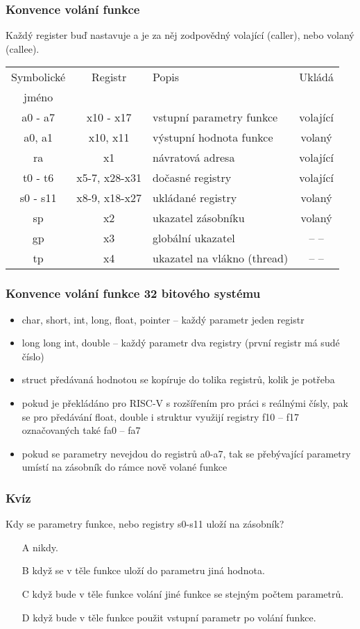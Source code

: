 \documentclass{beamer}
\begin{document}
\begin{frame}
\frametitle{Konvence volání funkce}

Každý register buď nastavuje a je za něj zodpovědný volající (caller), nebo volaný (callee). 

\begin{tabular}{|c|c|p{4cm}|c|}\hline
Symbolické & Registr & Popis & Ukládá \\
   jméno   &         &       &        \\ \hline
a0 - a7 & x10 - x17 & vstupní parametry funkce & volající \\\hline
a0, a1 & x10, x11 & výstupní hodnota funkce & volaný \\\hline
ra & x1 & návratová adresa & volající \\\hline
t0 - t6 & x5-7, x28-x31 & dočasné registry & volající\\\hline
s0 - s11 & x8-9, x18-x27 & ukládané registry & volaný\\\hline
sp & x2 & ukazatel zásobníku & volaný\\\hline
gp & x3 & globální ukazatel & -- --\\\hline
tp & x4 & ukazatel na vlákno (thread) & -- --\\\hline
\end{tabular}
\end{frame}


\begin{frame}
\frametitle{Konvence volání funkce 32 bitového systému}

\begin{itemize}
 \item char, short, int, long, float, pointer -- každý parametr jeden registr
 \item long long int, double -- každý parametr dva registry (první registr má sudé číslo)
 \item struct předávaná hodnotou se kopíruje do tolika registrů, kolik je potřeba
 \item pokud je překládáno pro RISC-V s rozšířením pro práci s reálnými čísly, pak se pro předávání float, double i struktur využijí registry f10 -- f17 označovaných také fa0 -- fa7
 \item pokud se parametry nevejdou do registrů a0-a7, tak se přebývající parametry umístí na zásobník do rámce nově volané funkce
\end{itemize}
\end{frame}


\begin{frame}
\frametitle{Kvíz}

Kdy se parametry funkce, nebo registry s0-s11 uloží na zásobník?
\begin{itemize}
 \item[A] nikdy.
 \item[B] když se v těle funkce uloží do parametru jiná hodnota.
 \item[C] když bude v těle funkce volání jiné funkce se stejným počtem parametrů.
 \item[D] když bude v těle funkce použit vstupní parametr po volání funkce.
\end{itemize}
\end{frame}
\end{document}
